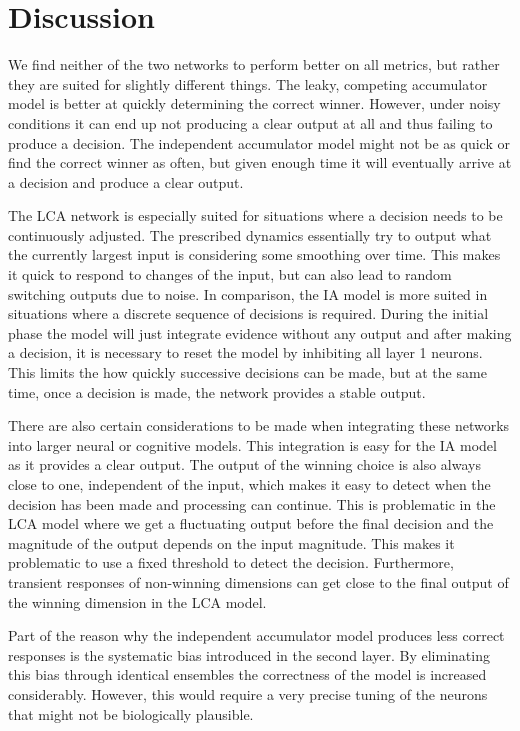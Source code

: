 \documentclass[10pt,letterpaper]{article}
\begin{document}
\section{Discussion}
We find neither of the two networks to perform better on all metrics, but rather 
they are suited for slightly different things. The leaky, competing accumulator 
model is better at quickly determining the correct winner. However, under noisy 
conditions it can end up not producing a clear output at all and thus failing to 
produce a decision.  The independent accumulator model might not be as quick or 
find the correct winner as often, but given enough time it will eventually 
arrive at a decision and produce a clear output.

The LCA network is especially suited for situations where a decision needs to be 
continuously adjusted. The prescribed dynamics essentially try to output what 
the currently largest input is considering some smoothing over time. This makes 
it quick to respond to changes of the input, but can also lead to random 
switching outputs due to noise. In comparison, the IA model is more suited in 
situations where a discrete sequence of decisions is required.  During the 
initial phase the model will just integrate evidence without any output and 
after making a decision, it is necessary to reset the model by inhibiting all 
layer 1 neurons. This limits the how quickly successive decisions can be made, 
but at the same time, once a decision is made, the network provides a stable 
output.

There are also certain considerations to be made when integrating these networks 
into larger neural or cognitive models. This integration is easy for the IA 
model as it provides a clear output. The output of the winning choice is also 
always close to one, independent of the input, which makes it easy to detect 
when the decision has been made and processing can continue. This is problematic 
in the LCA model where we get a fluctuating output before the final decision and 
the magnitude of the output depends on the input magnitude. This makes it 
problematic to use a fixed threshold to detect the decision. Furthermore, 
transient responses of non-winning dimensions can get close to the final output 
of the winning dimension in the LCA model.

Part of the reason why the independent accumulator model produces less correct 
responses is the systematic bias introduced in the second layer. By eliminating 
this bias through identical ensembles the correctness of the model is increased 
considerably. However, this would require a very precise tuning of the neurons 
that might not be biologically plausible.
\end{document}
